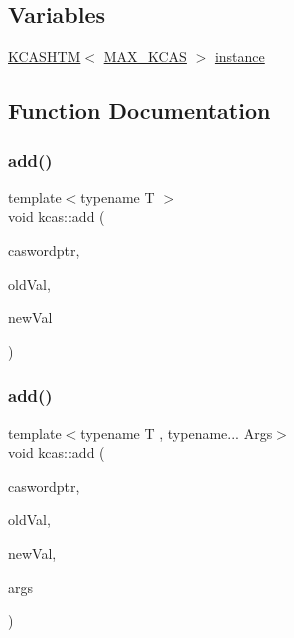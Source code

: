 \subsection*{Variables}
\begin{DoxyCompactItemize}
\item 
\hyperlink{classKCASHTM}{K\+C\+A\+S\+H\+TM}$<$ \hyperlink{skiplist_8h_a17681fc241567944ff9f0c062af6b7bf}{M\+A\+X\+\_\+\+K\+C\+AS} $>$ \hyperlink{namespacekcas_af460e5af7d85e9a87e52d4240e222fb5}{instance}
\end{DoxyCompactItemize}


\subsection{Function Documentation}
\mbox{\label{namespacekcas_acb0544489e45e08050227ab563d9ee15}} 
\subsubsection{\texorpdfstring{add()}{add()}\hspace{0.1cm}{\footnotesize\ttfamily [1/2]}}
{\footnotesize\ttfamily template$<$typename T $>$ \\
void kcas\+::add (\begin{DoxyParamCaption}\item[{\hyperlink{structcasword}{casword}$<$ T $>$ $\ast$}]{caswordptr,  }\item[{T}]{old\+Val,  }\item[{T}]{new\+Val }\end{DoxyParamCaption})}

\mbox{\label{namespacekcas_a227f3321961ae92470ed749e94656202}} 
\subsubsection{\texorpdfstring{add()}{add()}\hspace{0.1cm}{\footnotesize\ttfamily [2/2]}}
{\footnotesize\ttfamily template$<$typename T , typename... Args$>$ \\
void kcas\+::add (\begin{DoxyParamCaption}\item[{\hyperlink{structcasword}{casword}$<$ T $>$ $\ast$}]{caswordptr,  }\item[{T}]{old\+Val,  }\item[{T}]{new\+Val,  }\item[{Args...}]{args }\end{DoxyParamCaption})}

